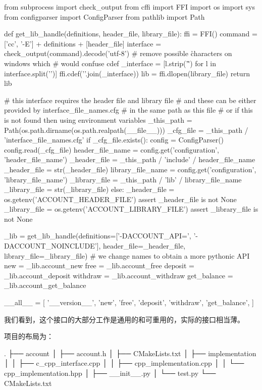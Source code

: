 \begin{codebox}[python]
from subprocess import check_output
from cffi import FFI
import os
import sys
from configparser import ConfigParser
from pathlib import Path

def get_lib_handle(definitions, header_file, library_file):
  ffi = FFI()
  command = ['cc', '-E'] + definitions + [header_file]
  interface = check_output(command).decode('utf-8')
  # remove possible \r characters on windows which
  # would confuse cdef
  _interface = [l.strip('\r') for l in interface.split('\n')]
  ffi.cdef('\n'.join(_interface))
  lib = ffi.dlopen(library_file)
  return lib

# this interface requires the header file and library file
# and these can be either provided by interface_file_names.cfg
# in the same path as this file
# or if this is not found then using environment variables
_this_path = Path(os.path.dirname(os.path.realpath(__file__)))
_cfg_file = _this_path / 'interface_file_names.cfg'
if _cfg_file.exists():
  config = ConfigParser()
  config.read(_cfg_file)
  header_file_name = config.get('configuration', 'header_file_name')
  _header_file = _this_path / 'include' / header_file_name
  _header_file = str(_header_file)
  library_file_name = config.get('configuration', 'library_file_name')
  _library_file = _this_path / 'lib' / library_file_name
  _library_file = str(_library_file)
else:
  _header_file = os.getenv('ACCOUNT_HEADER_FILE')
  assert _header_file is not None
  _library_file = os.getenv('ACCOUNT_LIBRARY_FILE')
  assert _library_file is not None

_lib = get_lib_handle(definitions=['-DACCOUNT_API=', '-DACCOUNT_NOINCLUDE'],
                      header_file=_header_file,
                      library_file=_library_file)
# we change names to obtain a more pythonic API
new = _lib.account_new
free = _lib.account_free
deposit = _lib.account_deposit
withdraw = _lib.account_withdraw
get_balance = _lib.account_get_balance

__all__ = [
    '__version__',
    'new',
    'free',
    'deposit',
    'withdraw',
    'get_balance',
]
\end{codebox}

我们看到，这个接口的大部分工作是通用的和可重用的，实际的接口相当薄。

项目的布局为：

\begin{codebox}[shell]
.
├── account
│    ├── account.h
│    ├── CMakeLists.txt
│    ├── implementation
│    │    ├── c_cpp_interface.cpp
│    │    ├── cpp_implementation.cpp
│    │    └── cpp_implementation.hpp
│    ├── __init__.py
│    └── test.py
└── CMakeLists.txt
\end{codebox}

